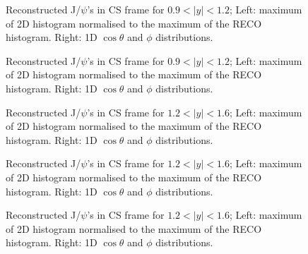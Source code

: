 \documentclass[12pt]{article}
\newcommand{\jpsi}{J/$\psi$}
\begin{document}
\begin{figure}[htbp]
\centering
{}
\caption{Reconstructed \jpsi's in CS frame for $0.9 < |y| < 1.2$; Left: maximum of 2D histogram normalised to the maximum of the RECO histogram. Right: 1D $\cos\theta$ and $\phi$ distributions.}
\label{fig:trackerMuonsVsEta}
\end{figure} \clearpage 


\begin{figure}[htbp]
\centering
{}
\caption{Reconstructed \jpsi's in CS frame for $0.9 < |y| < 1.2$; Left: maximum of 2D histogram normalised to the maximum of the RECO histogram. Right: 1D $\cos\theta$ and $\phi$ distributions.}
\label{fig:trackerMuonsVsEta}
\end{figure} \clearpage 



\begin{figure}[htbp]
\centering
{}
\caption{Reconstructed \jpsi's in CS frame for $1.2 < |y| < 1.6$; Left: maximum of 2D histogram normalised to the maximum of the RECO histogram. Right: 1D $\cos\theta$ and $\phi$ distributions.}
\label{fig:trackerMuonsVsEta}
\end{figure} \clearpage 

\begin{figure}[htbp]
\centering
{}
\caption{Reconstructed \jpsi's in CS frame for $1.2 < |y| < 1.6$; Left: maximum of 2D histogram normalised to the maximum of the RECO histogram. Right: 1D $\cos\theta$ and $\phi$ distributions.}
\label{fig:trackerMuonsVsEta}
\end{figure} \clearpage 

\begin{figure}[htbp]
\centering
{}
\caption{Reconstructed \jpsi's in CS frame for $1.2 < |y| < 1.6$; Left: maximum of 2D histogram normalised to the maximum of the RECO histogram. Right: 1D $\cos\theta$ and $\phi$ distributions.}
\label{fig:trackerMuonsVsEta}
\end{figure} \clearpage 
\end{document}
